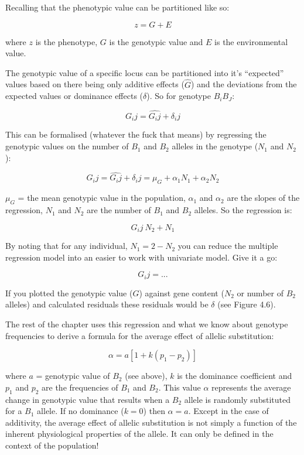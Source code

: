 \documentclass[
]{book}
\begin{document}
Recalling that the phenotypic value can be partitioned like so:

\[ z = G + E \]

where \(z\) is the phenotype, \(G\) is the genotypic value and \(E\) is the environmental value.

The genotypic value of a specific locus can be partitioned into it's ``expected'' values based on there being only additive effects (\(\hat{G}\)) and the deviations from the expected values or dominance effects (\(\delta\)). So for genotype \(B_iB_J\):

\[ G_ij = \hat{G_ij} + \delta_ij \]

This can be formalised (whatever the fuck that means) by regressing the genotypic values on the number of \(B_1\) and \(B_2\) alleles in the genotype (\(N_1\) and \(N_2\)):

\[ G_ij = \hat{G_ij} + \delta_ij = \mu_G + \alpha_1N_1 + \alpha_2N_2 \]

\(\mu_G\) = the mean genotypic value in the population, \(\alpha_1\) and \(\alpha_2\) are the slopes of the regression, \(N_1\) and \(N_2\) are the number of \(B_1\) and \(B_2\) alleles. So the regression is:

\[ G_ij ~ N_2 + N_1 \]

By noting that for any individual, \(N_1 = 2 - N_2\) you can reduce the multiple regression model into an easier to work with univariate model. Give it a go:

\[ G_ij = ... \]

If you plotted the genotypic value (\(G\)) against gene content (\(N_2\) or number of \(B_2\) alleles) and calculated residuals these residuals would be \(\delta\) (see Figure 4.6).

The rest of the chapter uses this regression and what we know about genotype frequencies to derive a formula for the average effect of allelic substitution:

\[ \alpha = a[1 + k(p_1 - p_2)] \]

where \(a\) = genotypic value of \(B_2\) (see above), \(k\) is the dominance coefficient and \(p_1\) and \(p_2\) are the frequencies of \(B_1\) and \(B_2\). This value \(\alpha\) represents the average change in genotypic value that results when a \(B_2\) allele is randomly substituted for a \(B_1\) allele. If no dominance (\(k = 0\)) then \(\alpha = a\). Except in the case of additivity, the average effect of allelic substitution is not simply a function of the inherent physiological properties of the allele. It can only be defined in the context of the population!
\end{document}
